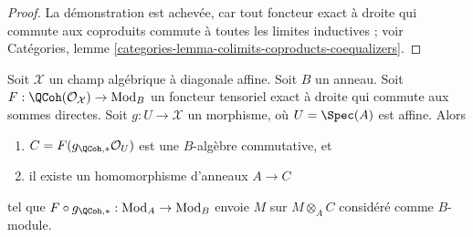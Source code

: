 \begin{proof}
\medskip\noindent
La démonstration est achevée, car tout foncteur exact à droite qui commute aux
coproduits commute à toutes les limites inductives ; voir
Catégories, lemme \ref{categories-lemma-colimits-coproducts-coequalizers}.
\end{proof}

\begin{lemma}
\label{lemma-affine}
Soit $\mathcal{X}$ un champ algébrique à diagonale affine.
Soit $B$ un anneau. Soit $F : \QCoh(\mathcal{O}_\mathcal{X}) \to \text{Mod}_B$
un foncteur tensoriel exact à droite qui commute aux sommes directes.
Soit $g : U \to \mathcal{X}$ un morphisme, où $U = \Spec(A)$ est affine. Alors
\begin{enumerate}
\item $C = F(g_{\QCoh, *}\mathcal{O}_U)$ est une $B$-algèbre commutative, et
\item il existe un homomorphisme d'anneaux $A \to C$
\end{enumerate}
tel que $F \circ g_{\QCoh, *} : \text{Mod}_A \to \text{Mod}_B$
envoie $M$ sur $M \otimes_A C$ considéré comme $B$-module.
\end{lemma}

